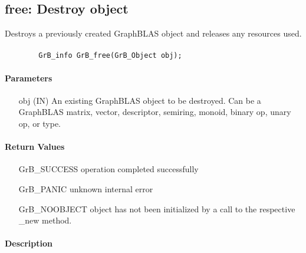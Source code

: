\subsection{{\sf free}: Destroy object}

Destroys a previously created GraphBLAS object and releases any resources used.

\paragraph{\syntax}

\begin{verbatim}
        GrB_info GrB_free(GrB_Object obj);
\end{verbatim}


\paragraph{Parameters}

\begin{itemize}[leftmargin=1.1in]
	\item[{\sf obj}] ({\sf IN}) An existing GraphBLAS object to be destroyed. 
    Can be a GraphBLAS matrix, vector, descriptor, semiring, monoid, binary op, 
    unary op, or type.
\end{itemize}

\paragraph{Return Values}

\begin{itemize}[leftmargin=2.1in]
\item[{\sf GrB\_SUCCESS}]        operation completed successfully
\item[{\sf GrB\_PANIC}]          unknown internal error
\item[{\sf GrB\_NOOBJECT}]       object has not been initialized by a call 
                                 to the respective {\sf *\_new} method.
\end{itemize}

\paragraph{Description}


